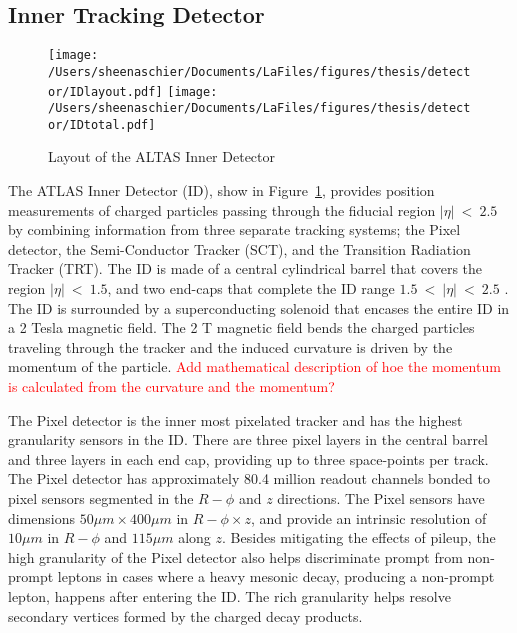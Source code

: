 \subsection{Inner Tracking Detector}
\label{sec:ID}
  \begin{figure}[tbp]
 \texttt{[image: /Users/sheenaschier/Documents/LaFiles/figures/thesis/detector/IDlayout.pdf]}
  \texttt{[image: /Users/sheenaschier/Documents/LaFiles/figures/thesis/detector/IDtotal.pdf]}
    \caption{Layout of the ALTAS Inner Detector}
   \label{fig:ID}
 \end{figure}
The ATLAS Inner Detector (ID), show in Figure~\ref{fig:ID}, provides position measurements of charged particles passing through the fiducial region $|\eta|~<~2.5$ by combining information from three separate tracking systems; the Pixel detector, the Semi-Conductor Tracker (SCT), and the Transition Radiation Tracker (TRT).  The ID is made of a central cylindrical barrel that covers the region $|\eta|~<~1.5$, and two end-caps that complete the ID range $1.5~<~|\eta|~<~2.5$ . The ID is surrounded by a superconducting solenoid that encases the entire ID in a 2 Tesla magnetic field.  The 2 T magnetic field bends the charged particles traveling through the tracker and the induced curvature is driven by the momentum of the particle.  \textcolor{red}{Add mathematical description of hoe the momentum is calculated from the curvature and the momentum?}
\iffalse
  \begin{figure}[tbp]
 \texttt{[image: /Users/sheenaschier/Documents/LaFiles/figures/thesis/detector/ID.pdf]}
  \texttt{[image: /Users/sheenaschier/Documents/LaFiles/figures/thesis/detector/IDendcap.pdf]}
    \caption{Layout of the ALTAS Inner Detector}
   \label{fig:IDscematic}
 \end{figure}
\fi

The Pixel detector is the inner most pixelated tracker and has the highest granularity sensors in the ID.  There are three pixel layers in the central barrel and three layers in each end cap, providing up to three space-points per track.  The Pixel detector has approximately 80.4 million readout channels bonded to pixel sensors segmented in the $R-\phi$ and $z$ directions.  The Pixel sensors have dimensions $50\mu m \times 400\mu m$ in $R-\phi \times z$, and provide an intrinsic resolution of $10\mu m$ in $R-\phi$ and $115 \mu m$ along $z$.  Besides mitigating the effects of pileup, the high granularity of the Pixel detector also helps discriminate prompt from non-prompt leptons in cases where a heavy mesonic decay, producing a non-prompt lepton, happens after entering the ID. The rich granularity helps resolve secondary vertices formed by the charged decay products.  


